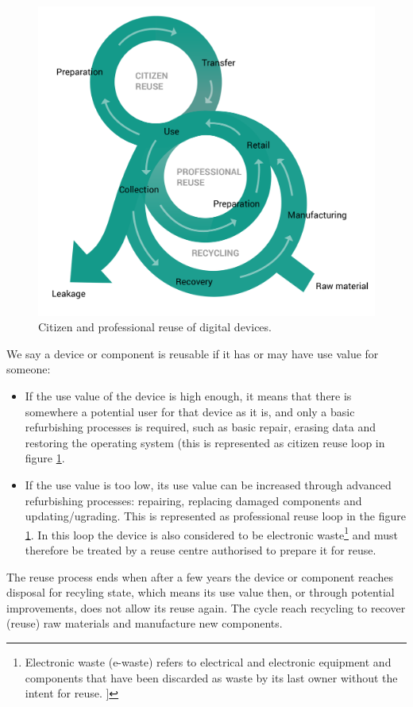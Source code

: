 \documentclass[
]{book}
\begin{document}
\begin{figure}

{\centering \includegraphics[width=0.5\linewidth]{./figs/27-mod1} 

}

\caption{Citizen and professional reuse of digital devices.}\label{fig:ereuseloops}
\end{figure}

We say a device or component is reusable if it has or may have use value for someone:

\begin{itemize}
\item
  If the use value of the device is high enough, it means that there is somewhere a potential user for that device as it is, and only a basic refurbishing processes is required, such as basic repair, erasing data and restoring the operating system (this is represented as citizen reuse loop in figure \ref{fig:ereuseloops}.
\item
  If the use value is too low, its use value can be increased through advanced refurbishing processes: repairing, replacing damaged components and updating/ugrading. This is represented as professional reuse loop in the figure \ref{fig:ereuseloops}. In this loop the device is also considered to be electronic waste\footnote{Electronic waste (e-waste) refers to electrical and electronic equipment and components that have been discarded as waste by its last owner without the intent for reuse. \citep{Comission2012}{]}} and must therefore be treated by a reuse centre authorised to prepare it for reuse.
\end{itemize}

The reuse process ends when after a few years the device or component reaches disposal for recyling state, which means its use value then, or through potential improvements, does not allow its reuse again. The cycle reach recycling to recover (reuse) raw materials and manufacture new components.
\end{document}
